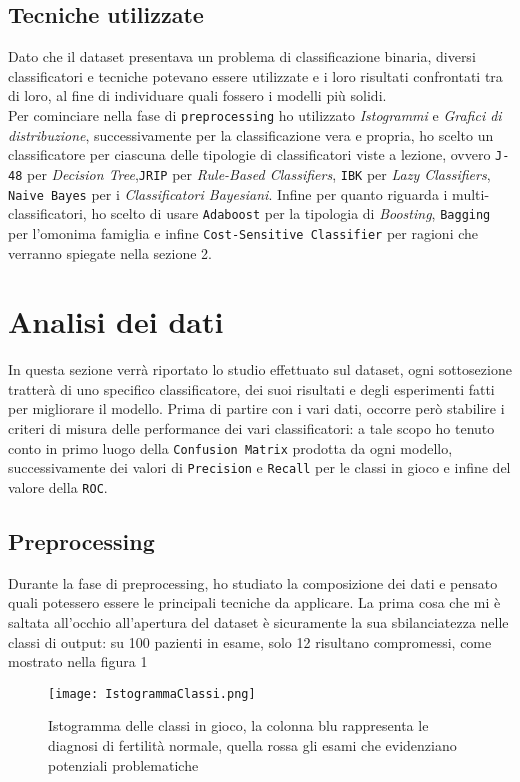   \subsection{Tecniche utilizzate}
  Dato che il dataset presentava un problema di classificazione binaria, diversi classificatori e tecniche potevano essere utilizzate e i loro risultati confrontati tra di loro, al fine di individuare quali fossero i modelli più solidi.\\
  Per cominciare nella fase di \texttt{preprocessing} ho utilizzato \textit{Istogrammi} e \textit{Grafici di distribuzione}, successivamente per la classificazione vera e propria, ho scelto un classificatore per ciascuna delle tipologie di classificatori viste a lezione, ovvero \texttt{J-48} per \textit{Decision Tree},\texttt{JRIP} per \textit{Rule-Based Classifiers}, \texttt{IBK} per \textit{Lazy Classifiers}, \texttt{Naive Bayes} per i \textit{Classificatori Bayesiani}.
  Infine per quanto riguarda i multi-classificatori, ho scelto di usare \texttt{Adaboost} per la tipologia di \textit{Boosting}, \texttt{Bagging} per l'omonima famiglia e infine \texttt{Cost-Sensitive Classifier} per ragioni che verranno spiegate nella sezione 2.
  \section{Analisi dei dati}
  In questa sezione verrà riportato lo studio effettuato sul dataset, ogni sottosezione tratterà di uno specifico classificatore, dei suoi risultati e degli esperimenti fatti per migliorare il modello.
  Prima di partire con i vari dati, occorre però stabilire i criteri di misura delle performance dei vari classificatori: a tale scopo ho tenuto conto in primo luogo della \texttt{Confusion Matrix} prodotta da ogni modello, successivamente dei valori di \texttt{Precision} e \texttt{Recall} per le classi in gioco e infine del valore della \texttt{ROC}.
  \subsection{Preprocessing}
  Durante la fase di preprocessing, ho studiato la composizione dei dati e pensato quali potessero essere le principali tecniche da applicare.
  La prima cosa che mi è saltata all'occhio all'apertura del dataset è sicuramente la sua sbilanciatezza nelle classi di output: su 100 pazienti in esame, solo 12 risultano compromessi, come mostrato nella figura 1
  
  \begin{figure}[H]
  	\texttt{[image: IstogrammaClassi.png]}
  	\caption{Istogramma delle classi in gioco, la colonna blu rappresenta le diagnosi di fertilità normale, quella rossa gli esami che evidenziano potenziali problematiche}
  \end{figure}

